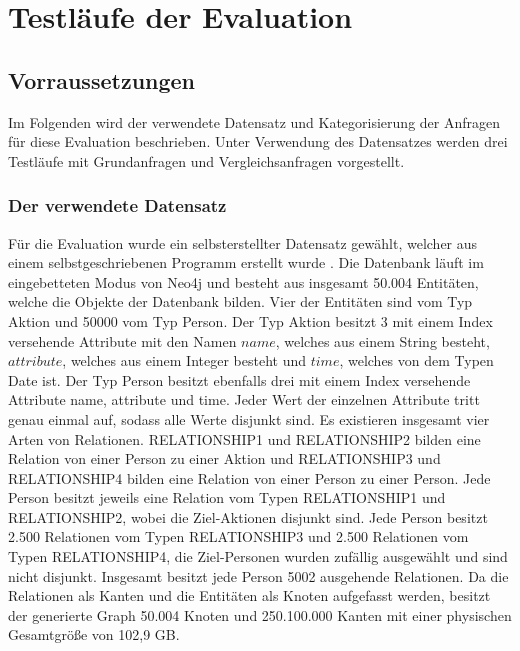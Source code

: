 
\chapter{Testläufe der Evaluation} %

\label{Kapitel3} %

\section{Vorraussetzungen}
Im Folgenden wird der verwendete Datensatz und Kategorisierung der Anfragen für diese Evaluation beschrieben. Unter Verwendung des Datensatzes werden drei Testläufe mit Grundanfragen und Vergleichsanfragen vorgestellt.  
\subsection{Der verwendete Datensatz}
Für die Evaluation wurde ein selbsterstellter Datensatz gewählt, welcher aus einem selbstgeschriebenen Programm erstellt wurde \parencite{Code}. Die Datenbank läuft im eingebetteten Modus von Neo4j und besteht aus insgesamt 50.004 Entitäten, welche die Objekte der Datenbank bilden. Vier der Entitäten sind  vom Typ Aktion und 50000 vom Typ Person. Der Typ Aktion besitzt 3 mit einem Index versehende Attribute mit den Namen $name$, welches aus einem String besteht, $attribute$, welches aus einem Integer besteht und $time$, welches von dem Typen Date ist. Der Typ Person besitzt ebenfalls drei mit einem Index versehende Attribute name, attribute und time. Jeder Wert der einzelnen Attribute tritt genau einmal auf, sodass alle Werte disjunkt sind. \newline
Es existieren insgesamt vier Arten von Relationen. RELATIONSHIP1 und RELATIONSHIP2 bilden eine Relation von einer Person zu einer Aktion und  RELATIONSHIP3 und RELATIONSHIP4 bilden eine Relation von einer Person zu einer Person. Jede Person besitzt jeweils eine Relation vom Typen RELATIONSHIP1 und RELATIONSHIP2, wobei die Ziel-Aktionen disjunkt sind. Jede Person besitzt 2.500 Relationen vom Typen RELATIONSHIP3 und 2.500 Relationen vom Typen RELATIONSHIP4, die Ziel-Personen wurden zufällig ausgewählt und sind nicht disjunkt. Insgesamt besitzt jede Person 5002 ausgehende Relationen. Da die Relationen als Kanten und die Entitäten als Knoten aufgefasst werden, besitzt der generierte Graph 50.004 Knoten und 250.100.000 Kanten mit einer physischen Gesamtgröße von 102,9 GB. 
